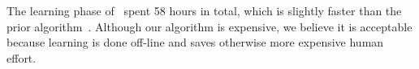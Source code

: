 
The learning phase of \ourtechnique~spent 58 hours in total, which is slightly faster than the prior algorithm~\cite{JeJeOh18}. 
Although our algorithm is expensive, we believe it is acceptable because learning is done off-line and saves otherwise more expensive human effort. 
%
%
%
%
%

